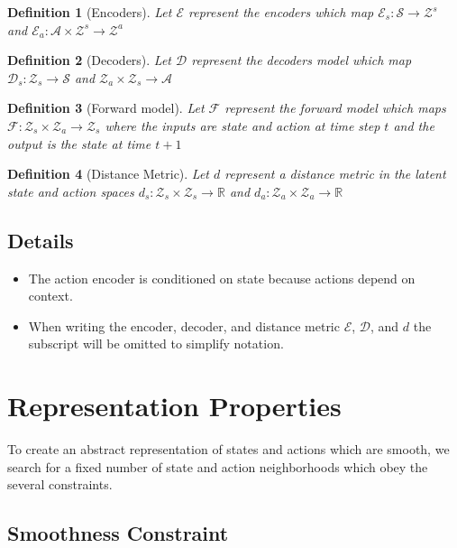 \documentclass{article}
\newtheorem{definition}{Definition}
\begin{document}
\begin{definition} [Encoders]
    Let \(\mathcal{E}\) represent the encoders which map \(\mathcal{E}_s: \mathcal{S}\rightarrow\mathcal{Z}^s\) and \(\mathcal{E}_a: \mathcal{A} \times \mathcal{Z}^s \rightarrow \mathcal{Z}^a\)
\end{definition}
\begin{definition} [Decoders]
    Let \(\mathcal{D}\) represent the decoders model which map \(\mathcal{D}_s: \mathcal{Z}_s\rightarrow\mathcal{S}\) and \(\mathcal{Z}_a \times \mathcal{Z}_s\rightarrow \mathcal{A}\)
\end{definition}
\begin{definition} [Forward model]
    Let \(\mathcal{F}\) represent the forward model which maps \(\mathcal{F}: \mathcal{Z}_s \times \mathcal{Z}_a \rightarrow \mathcal{Z}_s\) where the inputs are state and action at time step \(t\) and the output is the state at time \(t+1\)
\end{definition}
\begin{definition} [Distance Metric]
    Let \(d\) represent a distance metric in the latent state and action spaces \(d_s: \mathcal{Z}_s \times \mathcal{Z}_s \rightarrow \mathbb{R}\) and \(d_a: \mathcal{Z}_a \times \mathcal{Z}_a \rightarrow \mathbb{R}\)
\end{definition}

\subsection*{Details}
\begin{itemize}
    \item The action encoder is conditioned on state because actions depend on context.
    \item When writing the encoder, decoder, and distance metric \(\mathcal{E}\), \(\mathcal{D}\), and \(d\) the subscript will be omitted to simplify notation.
\end{itemize}

\section{Representation Properties}

To create an abstract representation of states and actions which are smooth, we search for a fixed number of state and action neighborhoods which obey the several constraints.

\subsection*{Smoothness Constraint}
\end{document}
